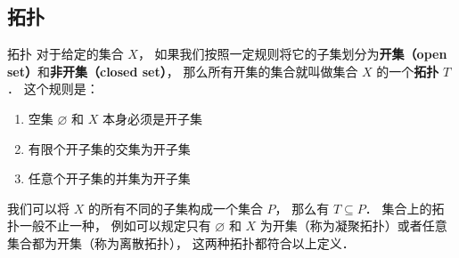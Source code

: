 

\subsection{拓扑}

\begin{definition}{拓扑}
对于给定的集合 $X$， 如果我们按照一定规则将它的子集划分为\textbf{开集（open set）}和\textbf{非开集（closed set）}， 那么所有开集的集合就叫做集合 $X$ 的一个\textbf{拓扑} $T$． 这个规则是：
\begin{enumerate}
\item 空集 $\varnothing$ 和 $X$ 本身必须是开子集
\item 有限个开子集的交集为开子集
\item 任意个开子集的并集为开子集
\end{enumerate}
\end{definition}

我们可以将 $X$ 的所有不同的子集构成一个集合 $P$， 那么有 $T \subseteq P$． 集合上的拓扑一般不止一种， 例如可以规定只有 $\varnothing$ 和 $X$ 为开集（称为凝聚拓扑）或者任意集合都为开集（称为离散拓扑）， 这两种拓扑都符合以上定义．

